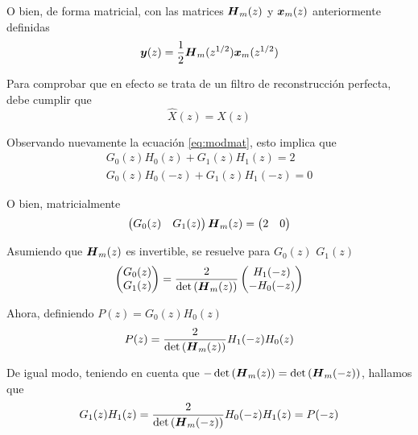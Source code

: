 	O bien, de forma matricial, con las matrices $\boldsymbol{H}_m(z)$ y $\boldsymbol{x}_m(z)$ anteriormente definidas
		\begin{equation}
			\boldsymbol{y}(z)=\frac{1}{2}\boldsymbol{H}_m(z^{1/2})\boldsymbol{x}_m(z^{1/2})
		\end{equation}

	Para comprobar que en efecto se trata de un filtro de reconstrucción perfecta, debe cumplir que
		\begin{equation}
			\hat{X}(z)=X(z)
		\end{equation}

	Observando nuevamente la ecuación \eqref{eq:modmat}, esto implica que
		\begin{align}
			G_0(z)H_0(z)+G_1(z)H_1(z)=2		\label{eq:modcond}\\
			G_0(z)H_0(-z)+G_1(z)H_1(-z)=0		\label{eq:modcond2}
		\end{align}

	O bien, matricialmente
		\begin{equation}
			\begin{pmatrix}
				G_0(z) & G_1(z)
			\end{pmatrix}
			\boldsymbol{H}_m(z)
			=
			\begin{pmatrix}
				2 & 0
			\end{pmatrix}
		\end{equation}

	Asumiendo que $\boldsymbol{H}_m(z)$ es invertible, se resuelve para $G_0(z)$ $G_1(z)$
		\begin{equation}
			\begin{pmatrix}
				G_0(z) \\
				G_1(z)
			\end{pmatrix}
			=
			\frac{2}{\det{(\boldsymbol{H}_m(z))}}
			\begin{pmatrix}
				H_1(-z) \\
				-H_0(-z)
			\end{pmatrix}
		\end{equation}
		
	Ahora, definiendo $P(z)=G_0(z)H_0(z)$
		\begin{equation}
			P(z)=\frac{2}{\det{(\boldsymbol{H}_m(z))}}H_1(-z)H_0(z)
		\end{equation}

	De igual modo, teniendo en cuenta que $-\det{(\boldsymbol{H}_m(z))}=\det{(\boldsymbol{H}_m(-z))}$, hallamos que
		\begin{equation}
			G_1(z)H_1(z)=\frac{2}{\det{(\boldsymbol{H}_m(-z))}}H_0(-z)H_1(z)=P(-z)
		\end{equation}

